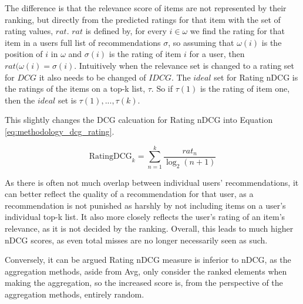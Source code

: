 The difference is that the relevance score of items are not represented by their ranking, but directly from the predicted ratings for that item with the set of rating values, $rat$. $rat$ is defined by, for every $i\in \omega$ we find the rating for that item in a users full list of recommendations $\sigma$, so assuming that $\omega(i)$ is the position of $i$ in $\omega$ and $\sigma(i)$ is the rating of item $i$ for a user, then $rat(\omega(i) = \sigma(i)$.
Intuitively when the relevance set is changed to a rating set for $DCG$ it also needs to be changed of $IDCG$. The $ideal$ set for Rating nDCG is the ratings of the items on a top-k list, $\tau$. So if $\tau(1)$ is the rating of item one, then the $ideal$ set is $\tau(1),...,\tau(k)$.

 This slightly changes the DCG calcuation for Rating nDCG into Equation \ref{eq:methodology_dcg_rating}.

\begin{equation}\label{eq:methodology_dcg_rating}
\text{RatingDCG}_k = \sum_{n=1}^{k}\frac{\textit{rat}_n}{\log_2(n + 1)}
\end{equation}

As there is often not much overlap between individual users' recommendations, it can better reflect the quality of a recommendation for that user, as a recommendation is not punished as harshly by not including items on a user's individual top-k list. It also more closely reflects the user's rating of an item's relevance, as it is not decided by the ranking. Overall, this leads to much higher nDCG scores, as even total misses are no longer necessarily seen as such.

Conversely, it can be argued Rating nDCG measure is inferior to nDCG, as the aggregation methods, aside from Avg, only consider the ranked elements when making the aggregation, so the increased score is, from the perspective of the aggregation methods, entirely random.